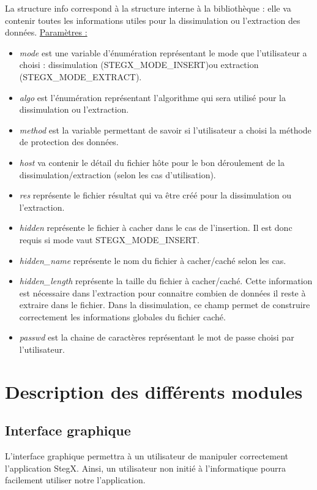 \documentclass[11pt]{article}
\begin{document}
La structure info correspond à la structure interne à la bibliothèque :
elle va contenir toutes les informations utiles pour la dissimulation ou 
l'extraction des données. 
\newline
\underline{Paramètres :}
\begin{itemize}
\item \textit{mode} est une variable d'énumération représentant le mode que 
l'utilisateur a choisi : dissimulation (STEGX\_MODE\_INSERT)ou extraction 
(STEGX\_MODE\_EXTRACT). 
\item \textit{algo} est l'énumération représentant l'algorithme qui sera utilisé
pour la dissimulation ou l'extraction. 
\item \textit{method} est la variable permettant de savoir si l'utilisateur 
a choisi la méthode de protection des données. 
\item \textit{host} va contenir le détail du fichier hôte pour le bon déroulement 
de la dissimulation/extraction (selon les cas d'utilisation). 
\item \textit{res} représente le fichier résultat qui va être créé pour la 
dissimulation ou l'extraction.  
\item \textit{hidden} représente le fichier à cacher dans le cas de l'insertion. 
Il est donc requis si mode vaut STEGX\_MODE\_INSERT. 
\item \textit{hidden\_name} représente le nom du fichier à cacher/caché selon 
les cas. 
\item \textit{hidden\_length} représente la taille du fichier à cacher/caché. 
Cette information est nécessaire dans l'extraction pour connaitre combien de 
données il reste à extraire dans le fichier. Dans la dissimulation, ce champ 
permet de construire correctement les informations globales du fichier caché. 
\item \textit{passwd} est la chaine de caractères représentant le mot de passe 
choisi par l'utilisateur. 
\newline
\end{itemize}

\section{Description des différents modules}
\subsection{Interface graphique}

L'interface graphique permettra à un utilisateur de manipuler correctement
l'application StegX. Ainsi, un utilisateur non initié à l'informatique pourra
facilement utiliser notre l'application. 
\end{document}
